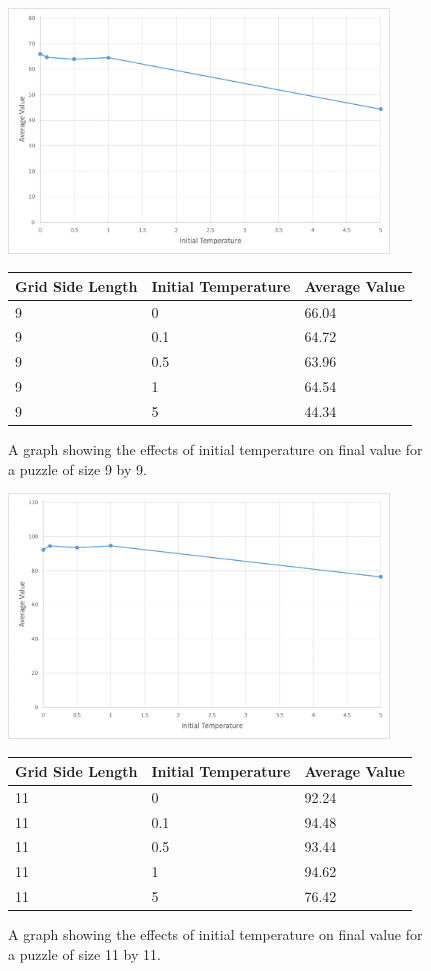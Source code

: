 \documentclass[12pt]{article}
\begin{document}
\begin{figure}[H]
    \centering
    \includegraphics[width=0.9\textwidth]{simulated_annealing_9x9_temperature_excel}
\begin{tabular}{ |p{4cm}||p{4cm}|p{4cm}|  }
 \hline
Grid Side Length& Initial Temperature &Average Value\\
 \hline
9&0&66.04\\
9&0.1&64.72\\
9&0.5&63.96\\
9&1&64.54\\
9&5&44.34\\
 \hline
\end{tabular}
    \caption{A graph showing the effects of initial temperature on final value for a puzzle of size 9 by 9.}
    \label{fig:simulated_annealing_9x9_temperature}
\end{figure}

\begin{figure}[H]
    \centering
    \includegraphics[width=0.9\textwidth]{simulated_annealing_11x11_temperature_excel}
\begin{tabular}{ |p{4cm}||p{4cm}|p{4cm}|  }
 \hline
Grid Side Length& Initial Temperature &Average Value\\
 \hline
11&0&92.24\\
11&0.1&94.48\\
11&0.5&93.44\\
11&1&94.62\\
11&5&76.42\\
 \hline
\end{tabular}
    \caption{A graph showing the effects of initial temperature on final value for a puzzle of size 11 by 11.}
    \label{fig:simulated_annealing_11x11_temperature}
\end{figure}
\end{document}
